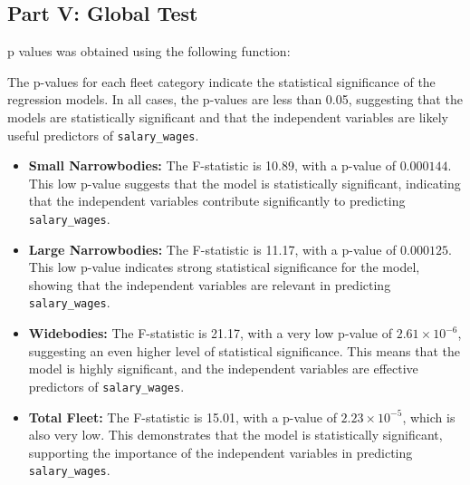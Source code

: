 \subsection{Part V: Global Test}
p values was obtained using the following function:

The p-values for each fleet category indicate the statistical significance of the regression models. In all cases, the p-values are less than 0.05, suggesting that the models are statistically significant and that the independent variables are likely useful predictors of \texttt{salary\_wages}.

\begin{itemize}
    \item \textbf{Small Narrowbodies:} The F-statistic is 10.89, with a p-value of \(0.000144\). This low p-value suggests that the model is statistically significant, indicating that the independent variables contribute significantly to predicting \texttt{salary\_wages}.

    \item \textbf{Large Narrowbodies:} The F-statistic is 11.17, with a p-value of \(0.000125\). This low p-value indicates strong statistical significance for the model, showing that the independent variables are relevant in predicting \texttt{salary\_wages}.

    \item \textbf{Widebodies:} The F-statistic is 21.17, with a very low p-value of \(2.61 \times 10^{-6}\), suggesting an even higher level of statistical significance. This means that the model is highly significant, and the independent variables are effective predictors of \texttt{salary\_wages}.

    \item \textbf{Total Fleet:} The F-statistic is 15.01, with a p-value of \(2.23 \times 10^{-5}\), which is also very low. This demonstrates that the model is statistically significant, supporting the importance of the independent variables in predicting \texttt{salary\_wages}.
\end{itemize}
